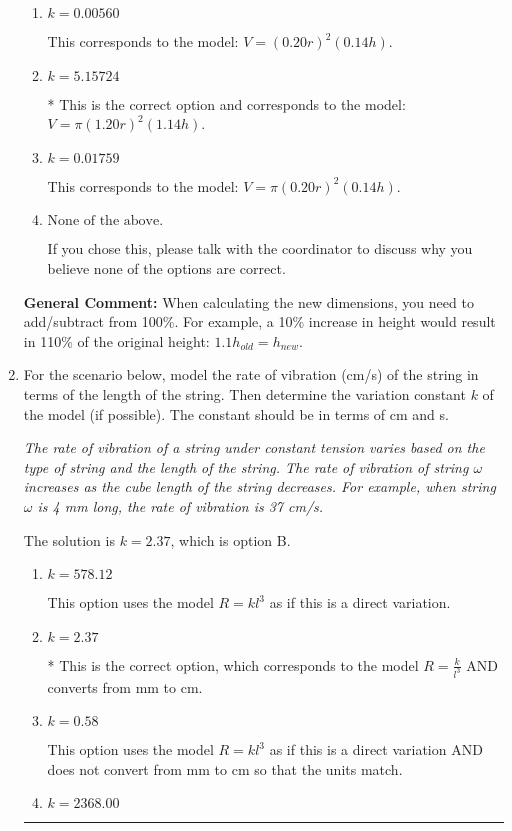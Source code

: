 \documentclass{extbook}[14pt]
\newcommand{\litem}[1]{\item #1

\rule{\textwidth}{0.4pt}}
\begin{document}
\begin{enumerate}
{\begin{enumerate}[label=\Alph*.]
This corresponds to the model: $V = (1.20 r)^2 (1.14 h)$.
\item \( k = 0.00560 \)

This corresponds to the model: $V = (0.20 r)^2 (0.14 h)$.
\item \( k = 5.15724 \)

* This is the correct option and corresponds to the model: $V = \pi (1.20 r)^2 (1.14 h)$.
\item \( k = 0.01759 \)

This corresponds to the model: $V = \pi (0.20 r)^2 (0.14 h)$.
\item \( \text{None of the above.} \)

If you chose this, please talk with the coordinator to discuss why you believe none of the options are correct.
\end{enumerate}

\textbf{General Comment:} When calculating the new dimensions, you need to add/subtract from 100\%. For example, a 10\% increase in height would result in 110\% of the original height: $1.1h_{old} = h_{new}$.
}
\litem{
For the scenario below, model the rate of vibration (cm/s) of the string in terms of the length of the string. Then determine the variation constant $k$ of the model (if possible). The constant should be in terms of cm and s.

\begin{center}
    \textit{ The rate of vibration of a string under constant tension varies based on the type of string and the length of the string. The rate of vibration of string $\omega$ increases as the cube length of the string decreases. For example, when string $\omega$ is 4 mm long, the rate of vibration is 37 cm/s. }
\end{center}
The solution is \( k = 2.37 \), which is option B.\begin{enumerate}[label=\Alph*.]
\item \( k = 578.12 \)

This option uses the model $R = kl^{3}$ as if this is a direct variation.
\item \( k = 2.37 \)

* This is the correct option, which corresponds to the model $R = \frac{k}{l^{3}}$ AND converts from mm to cm.
\item \( k = 0.58 \)

This option uses the model $R = kl^{3}$ as if this is a direct variation AND does not convert from mm to cm so that the units match.
\item \( k = 2368.00 \)


\end{enumerate}}
\end{enumerate}
\end{document}

